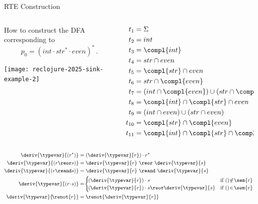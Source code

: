 \begin{frame}{RTE Construction}
  \begin{columns}
    \begin{column}{0.5\textwidth}
      How to construct the DFA corresponding to \[p_0=(int \cdot str^{*} \cdot even)^{*}\,.\]
      
      \texttt{[image: reclojure-2025-sink-example-2]}
    \end{column}
    \begin{column}{0.5\textwidth}
      \begin{align*}
        t_1 &= \Sigma\\
        t_2 &= int  \\
        t_3 &= \compl{int}\\
        t_4 &= str \cap even\\
        t_5 &= \compl{str} \cap even\\
        t_6 &= str \cap \compl{even}\\
        t_7 &= (int \cap \compl{even}) \cup (str \cap \compl{even})\\
        t_8   &=\compl{int} \cap \compl{str} \cap even\\
        t_9 &=(int \cap even) \cup (str \cap even)\\
        t_{10} &=\compl{str} \cap \compl{even}\\
        t_{11} &=\compl{int} \cap \compl{str} \cap \compl{even}
      \end{align*}
    \end{column}
  \end{columns}
\end{frame}


\newsavebox\boxa
\begin{lrbox}{\boxa}
  \begin{minipage}{0.4\textwidth}
\begin{align*}
  \deriv{\typevar}{(r^{*})}      &= (\deriv{\typevar}{r}) \cdot r^{*}\\
  \deriv{\typevar}{(r \reor s)}   &= \deriv{\typevar}{r} ~ \reor~ \deriv{\typevar}{s}\\
  \deriv{\typevar}{(r \reand s)} &= \deriv{\typevar}{r} ~ \reand~  \deriv{\typevar}{s}\\
  \deriv{\typevar}{(r\!\cdot\! s)} & =\! \begin{cases}
    \!(\deriv{\typevar}{r})\cdot s & \text{if $()\!\not\in\!\sem{r}$} \\
    \!(\deriv{\typevar}{r})\cdot s \reor \deriv{\typevar}{s} & \text{if $()\!\in\!\sem{r}$}
  \end{cases}\\
  \deriv{\typevar}{\!\renot{r}}  &= \renot{\deriv{\typevar}{r}}
\end{align*}
  \end{minipage}
\end{lrbox}



